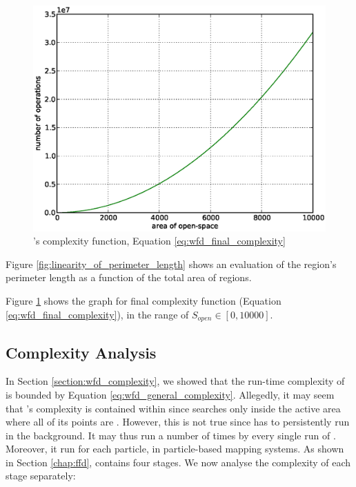 \begin{figure}
\centering
\includegraphics[width=0.6\columnwidth,keepaspectratio]{images/wfd_comp.eps}
\caption{\WFD's complexity function, Equation \eqref{eq:wfd_final_complexity}
}
\label{fig:wfd_final_complexity}
\end{figure}

Figure \ref{fig:linearity_of_perimeter_length} shows an evaluation of the
\openspace region's perimeter length as a function of the total area of
\openspace regions.

Figure \ref{fig:wfd_final_complexity} shows the graph for \WFD final complexity
function (Equation \eqref{eq:wfd_final_complexity}), in the range
of $S_{open} \in \left[0,10000\right]$.




\subsection{\FFD Complexity Analysis}
\label{section:ffd_complexity}
In Section \ref{section:wfd_complexity}, we showed that the run-time complexity
of \WFD is bounded by Equation \eqref{eq:wfd_general_complexity}.
Allegedly, it may seem that \FFD's complexity is contained within \WFD since
\FFD searches only inside the active area where all of its points are
\openspace. However, this is not true since \FFD has to persistently run in the
background. It may thus run a number of times by every single run of \WFD.
Moreover, it run for each particle, in particle-based mapping systems.
As shown in Section \ref{chap:ffd}, \FFD contains four stages.
We now analyse the complexity of each stage separately: 

